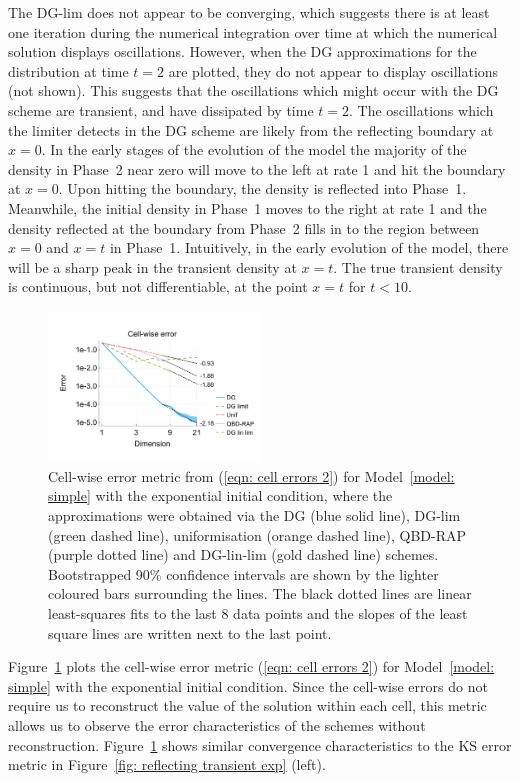 The DG-lim does not appear to be converging, which suggests there is at least one iteration during the numerical integration over time at which the numerical solution displays oscillations. However, when the DG approximations for the distribution at time \(t=2\) are plotted, they do not appear to display oscillations (not shown). This suggests that the oscillations which might occur with the DG scheme are transient, and have dissipated by time \(t=2\). The oscillations which the limiter detects in the DG scheme are likely from the reflecting boundary at \(x=0\). In the early stages of the evolution of the model the majority of the density in Phase~2 near zero will move to the left at rate 1 and hit the boundary at \(x=0\). Upon hitting the boundary, the density is reflected into Phase~1. Meanwhile, the initial density in Phase~1 moves to the right at rate 1 and the density reflected at the boundary from Phase~2 fills in to the region between \(x=0\) and \(x=t\) in Phase~1. Intuitively, in the early evolution of the model, there will be a sharp peak in the transient density at \(x=t\). The true transient density is continuous, but not differentiable, at the point \(x=t\) for \(t<10\).  %

\begin{figure}[h]
	\centering
	\includegraphics[width=0.5\textwidth,trim={0.75cm 0.8cm 0.25cm 1.25cm},clip]{chapter6/figs/hitting_times_model/reflecting_model/transient_distribution/exp/L1_cell_probs_error_formatted.pdf}
	\caption{Cell-wise error metric from (\ref{eqn: cell errors 2}) for Model~\ref{model: simple} with the exponential initial condition, where the approximations were obtained via the DG (blue solid line), DG-lim (green dashed line), uniformisation (orange dashed line), QBD-RAP (purple dotted line) and DG-lin-lim (gold dashed line) schemes. Bootstrapped 90\% confidence intervals are shown by the lighter coloured bars surrounding the lines. The black dotted lines are linear least-squares fits to the last 8 data points and the slopes of the least square lines are written next to the last point.} 
	\label{fig: reflecting transient exp cp} 
\end{figure}
Figure~\ref{fig: reflecting transient exp cp} plots the cell-wise error metric (\ref{eqn: cell errors 2}) for Model~\ref{model: simple} with the exponential initial condition. Since the cell-wise errors do not require us to reconstruct the value of the solution within each cell, this metric allows us to observe the error characteristics of the schemes without reconstruction. Figure~\ref{fig: reflecting transient exp cp} shows similar convergence characteristics to the KS error metric in Figure~\ref{fig: reflecting transient exp} (left). 

